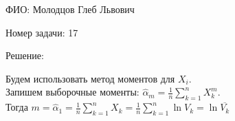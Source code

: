 \documentclass[14pt]{extarticle}
\begin{document}
ФИО: Молодцов Глеб Львович

\vspace{10pt}

Номер задачи: 17

\vspace{10pt}

Решение:

\vspace{10pt}

Будем использовать метод моментов для $X_i$.\\
Запишем выборочные моменты: $\hat{\alpha}_m = \frac{1}{n}\sum\limits_{k=1}^n X_k^m$. \\
Тогда $m = \hat{\alpha}_1 = \frac{1}{n}\sum\limits_{k=1}^n X_k = \frac{1}{n}\sum\limits_{k=1}^n \ln V_k = \ln \overline{V_k}$
\end{document}
